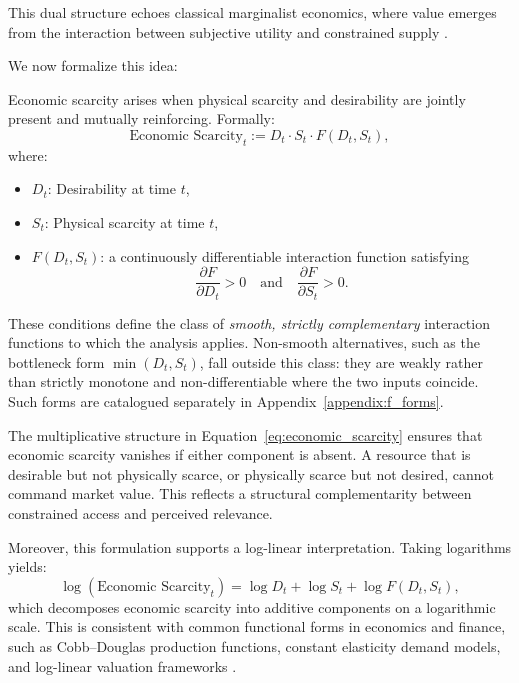 \documentclass[12pt]{article}
\begin{document}
This dual structure echoes classical marginalist economics, where value emerges from the interaction between subjective utility and constrained supply \citep{menger1871principles, jevons1871political}.

We now formalize this idea:

\begin{tcolorbox}[title=\textbf{Proposition 2}]
Economic scarcity arises when physical scarcity and desirability are jointly present and mutually reinforcing. Formally:
\begin{equation}
\text{Economic Scarcity}_t := D_t \cdot S_t \cdot F(D_t, S_t),
\label{eq:economic_scarcity}
\end{equation}
where:
\begin{itemize}
  \item \( D_t \): Desirability at time \( t \),
  \item \( S_t \): Physical scarcity at time \( t \),
  \item \( F(D_t, S_t) \): a continuously differentiable interaction function satisfying
  \[
  \frac{\partial F}{\partial D_t} > 0 \quad \text{and} \quad \frac{\partial F}{\partial S_t} > 0.
  \]
\end{itemize}
These conditions define the class of \emph{smooth, strictly complementary} interaction functions to which the analysis applies. Non-smooth alternatives, such as the bottleneck form \( \min(D_t, S_t) \), fall outside this class: they are weakly rather than strictly monotone and non-differentiable where the two inputs coincide. Such forms are catalogued separately in Appendix~\ref{appendix:f_forms}.
\end{tcolorbox}

The multiplicative structure in Equation~\ref{eq:economic_scarcity} ensures that economic scarcity vanishes if either component is absent. A resource that is desirable but not physically scarce, or physically scarce but not desired, cannot command market value. This reflects a structural complementarity between constrained access and perceived relevance.

Moreover, this formulation supports a log-linear interpretation. Taking logarithms yields:
\begin{equation}
\log(\text{Economic Scarcity}_t) = \log D_t + \log S_t + \log F(D_t, S_t),
\label{eq:log_scarcity}
\end{equation}
which decomposes economic scarcity into additive components on a logarithmic scale. This is consistent with common functional forms in economics and finance, such as Cobb–Douglas production functions, constant elasticity demand models, and log-linear valuation frameworks \citep{varian1992microeconomic, campbell1997econometrics}.
\end{document}
